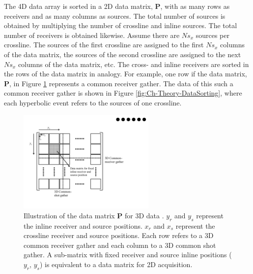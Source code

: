 The 4D data array is sorted in a 2D data matrix, $\mathbf{P}$, with as many rows as receivers and as many columns as sources. The total number of sources is obtained by multiplying the number of crossline and inline sources. The total number of receivers is obtained likewise. Assume there are $Ns_x$ sources per crossline. The sources of the first crossline are assigned to the first $Ns_x$ columns of the data matrix, the sources of the second crossline are assigned to the next $Ns_x$ columns of the data matrix, etc. The cross- and inline receivers are sorted in the rows of the data matrix in analogy. For example, one row if the data matrix, $\mathbf{P}$, in Figure \ref{fig:Ch-Theory-DelphiFormat} represents  a common receiver gather. The data of this such a common receiver gather is shown in Figure \ref{fig:Ch-Theory-DataSorting}, where each hyperbolic event refers to the sources of one crossline.

\begin{figure}
	\centering
	\includegraphics[width=0.6\textwidth]{Plots/DelphiFormat-v2}
	\caption{Illustration of the data matrix $\mathbf{P}$ for 3D data \citep{Delphi-Format}. $y_r$ and $y_s$ represent the inline receiver and source positions. $x_r$ and $x_s$ represent the crossline receiver and source positions. Each row refers to a 3D common receiver gather and each column to a 3D common shot gather. A sub-matrix with fixed receiver and source inline positions ($y_r$, $y_s$) is equivalent to a data matrix for 2D acquisition.}
	\label{fig:Ch-Theory-DelphiFormat}
\end{figure}


